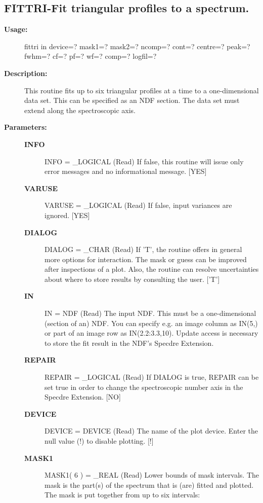 \subsection{FITTRI-\label{FITTRI}Fit triangular profiles to a spectrum.}
\begin{description}

\item [{\bf Usage:}]

   fittri in device=? mask1=? mask2=?
      ncomp=? cont=? centre=? peak=? fwhm=? cf=? pf=? wf=?
      comp=? logfil=?


\item [{\bf Description:}]

   This routine fits up to six triangular profiles at a time to a
   one-dimensional data set. This can be specified as an NDF section.
   The data set must extend along the spectroscopic axis.


\item [{\bf Parameters:}]
\begin{description}
\item [{\bf INFO}]
INFO = _LOGICAL (Read)
   If false, this routine will issue only error messages and no
   informational message. [YES]
\item [{\bf VARUSE}]
VARUSE = _LOGICAL (Read)
   If false, input variances are ignored. [YES]
\item [{\bf DIALOG}]
DIALOG = _CHAR (Read)
   If 'T', the routine offers in general more options for
   interaction. The mask or guess can be improved after
   inspections of a plot. Also, the routine can resolve
   uncertainties about where to store results by consulting the
   user. ['T']
\item [{\bf IN}]
IN = NDF (Read)
   The input NDF. This must be a one-dimensional (section of an)
   NDF. You can specify e.g. an image column as IN(5,) or part of
   an image row as IN(2.2:3.3,10). Update access is necessary to
   store the fit result in the NDF's Specdre Extension.
\item [{\bf REPAIR}]
REPAIR = _LOGICAL (Read)
   If DIALOG is true, REPAIR can be set true in order to change
   the spectroscopic number axis in the Specdre Extension. [NO]
\item [{\bf DEVICE}]
DEVICE = DEVICE (Read)
   The name of the plot device. Enter the null value (!) to
   disable plotting. [!]
\item [{\bf MASK1}]
MASK1( 6 ) = _REAL (Read)
   Lower bounds of mask intervals. The mask is the part(s) of the
   spectrum that is (are) fitted and plotted. The mask is put
   together from up to six intervals:


\end{description}
\end{description}
